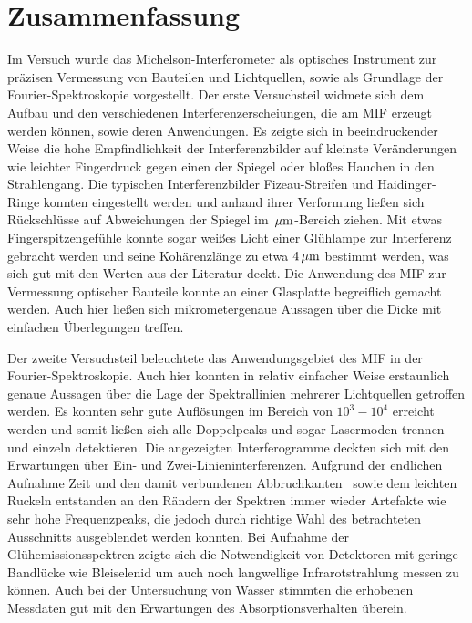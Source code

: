 
\section{Zusammenfassung} %
\label{sec:zusammenfassung}

	Im Versuch wurde das Michelson-Interferometer als optisches Instrument zur präzisen Vermessung von Bauteilen und Lichtquellen, sowie als Grundlage der Fourier-Spektroskopie vorgestellt.
	Der erste Versuchsteil widmete sich dem Aufbau und den verschiedenen Interferenzerscheiungen, die am MIF erzeugt werden können, sowie deren Anwendungen.
	Es zeigte sich in beeindruckender Weise die hohe Empfindlichkeit der Interferenzbilder auf kleinste Veränderungen wie leichter Fingerdruck gegen einen der Spiegel oder bloßes Hauchen in den Strahlengang.
	Die typischen Interferenzbilder Fizeau-Streifen und Haidinger-Ringe konnten eingestellt werden und anhand ihrer Verformung ließen sich Rückschlüsse auf Abweichungen der Spiegel im $\,\mu\mathrm{m}$-Bereich ziehen.
	Mit etwas Fingerspitzengefühle konnte sogar weißes Licht einer Glühlampe zur Interferenz gebracht werden und seine Kohärenzlänge zu etwa $4 \,\mu\mathrm{m}$ bestimmt werden, was sich gut mit den Werten aus der Literatur deckt.
	Die Anwendung des MIF zur Vermessung optischer Bauteile konnte an einer Glasplatte begreiflich gemacht werden.
	Auch hier ließen sich mikrometergenaue Aussagen über die Dicke mit einfachen Überlegungen treffen.

	Der zweite Versuchsteil beleuchtete das Anwendungsgebiet des MIF in der Fourier-Spektroskopie.
	Auch hier konnten in relativ einfacher Weise erstaunlich genaue Aussagen über die Lage der Spektrallinien mehrerer Lichtquellen getroffen werden.
	Es konnten sehr gute Auflösungen im Bereich von $10^{3} - 10^{4}$ erreicht werden und somit ließen sich alle Doppelpeaks und sogar Lasermoden trennen und einzeln detektieren.
	Die angezeigten Interferogramme deckten sich mit den Erwartungen über Ein- und Zwei-Linieninterferenzen.
	Aufgrund der endlichen Aufnahme Zeit und den damit verbundenen \glqq Abbruchkanten \grqq\ sowie dem leichten Ruckeln entstanden an den Rändern der Spektren immer wieder Artefakte wie sehr hohe Frequenzpeaks, die jedoch durch richtige Wahl des betrachteten Ausschnitts ausgeblendet werden konnten.
	Bei Aufnahme der Glühemissionsspektren zeigte sich die Notwendigkeit von Detektoren mit geringe Bandlücke wie Bleiselenid um auch noch langwellige Infrarotstrahlung messen zu können.
	Auch bei der Untersuchung von Wasser stimmten die erhobenen Messdaten gut mit den Erwartungen des Absorptionsverhalten überein.

